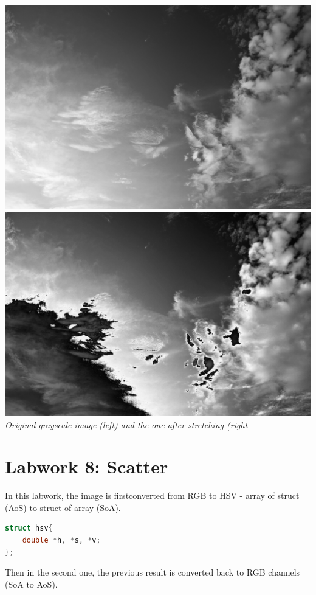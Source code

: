 \documentclass{article}
\begin{document}
\includegraphics[scale=0.045]{skyGray.jpg}
\includegraphics[scale=0.045]{labwork7-gpu-out.jpg}\\
\textit{Original grayscale image (left) and the one after stretching (right}

\section{Labwork 8: Scatter}
In this labwork, the image is firstconverted from RGB to HSV  - array of struct (AoS) to struct of array (SoA).

\begin{lstlisting}[language=C]
struct hsv{
	double *h, *s, *v;
};
\end{lstlisting} 
Then in the second one, the previous result is converted back to RGB channels (SoA to AoS).\\
\end{document}
